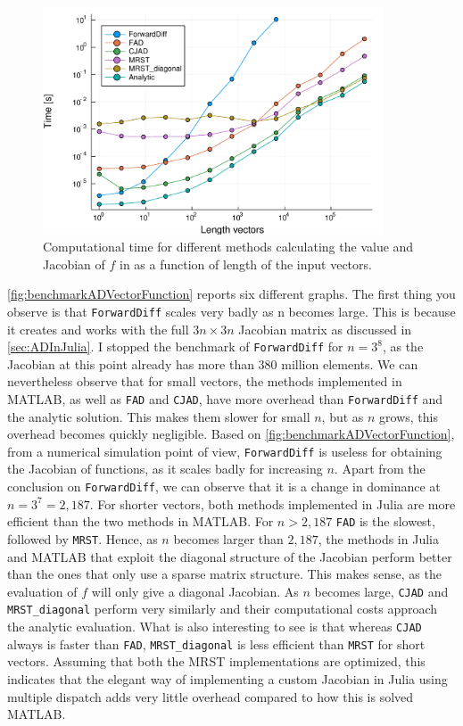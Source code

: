 \begin{figure}[H]
    \centering
    \includegraphics[width = 0.9\textwidth]{figures/benchmark_all_ADs.pdf}
    \caption{Computational time for different methods calculating the value and Jacobian of $f$ in  as a function of length of the input vectors.}
    \label{fig:benchmarkADVectorFunction}
\end{figure}
\autoref{fig:benchmarkADVectorFunction} reports six different graphs. The first thing you observe is that \texttt{ForwardDiff} scales very badly as n becomes large. This is because it creates and works with the full $3n \times 3n$ Jacobian matrix as discussed in \autoref{sec:ADInJulia}. I stopped the benchmark of \texttt{ForwardDiff} for $n = 3^8$, as the Jacobian at this point already has more than 380 million elements. We can nevertheless observe that for small vectors, the methods implemented in MATLAB, as well as \texttt{FAD} and \texttt{CJAD}, have more overhead than \texttt{ForwardDiff} and the analytic solution. This makes them slower for small $n$, but as $n$ grows, this overhead becomes quickly negligible. Based on \autoref{fig:benchmarkADVectorFunction}, from a numerical simulation point of view, \texttt{ForwardDiff} is useless for obtaining the Jacobian of functions, as it scales badly for increasing $n$.
Apart from the conclusion on \texttt{ForwardDiff}, we can observe that it is a change in dominance at $n = 3^7 = 2,187$. For shorter vectors, both methods implemented in Julia are more efficient than the two methods in MATLAB. For $n>2,187$ \texttt{FAD} is the slowest, followed by \texttt{MRST}. Hence, as $n$ becomes larger than $2,187$, the methods in Julia and MATLAB that exploit the diagonal structure of the Jacobian perform better than the ones that only use a sparse matrix structure. This makes sense, as the evaluation of $f$ will only give a diagonal Jacobian. As $n$ becomes large, \texttt{CJAD} and \texttt{MRST\_diagonal} perform very similarly and their computational costs approach the analytic evaluation. What is also interesting to see is that whereas \texttt{CJAD} always is faster than \texttt{FAD}, \texttt{MRST\_diagonal} is less efficient than \texttt{MRST} for short vectors. Assuming that both the MRST implementations are optimized, this indicates that the elegant way of implementing a custom Jacobian in Julia using multiple dispatch adds very little overhead compared to how this is solved MATLAB. 

